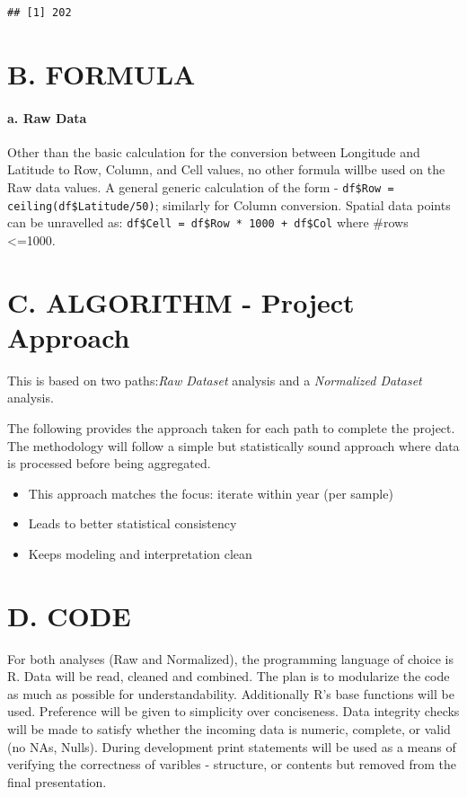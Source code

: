\documentclass[
]{article}
\begin{document}
\begin{verbatim}
## [1] 202
\end{verbatim}

\section{B. FORMULA}\label{b.-formula}

\paragraph{a. Raw Data}\label{a.-raw-data}

Other than the basic calculation for the conversion between Longitude
and Latitude to Row, Column, and Cell values, no other formula willbe
used on the Raw data values. A general generic calculation of the form -
\texttt{df\$Row = ceiling(df\$Latitude/50)}; similarly for Column
conversion. Spatial data points can be unravelled as:
\texttt{df\$Cell = df\$Row * 1000 + df\$Col} where \#rows
\textless=1000.

\section{C. ALGORITHM - Project
Approach}\label{c.-algorithm---project-approach}

This is based on two paths:\emph{Raw Dataset} analysis and a
\emph{Normalized Dataset} analysis.

The following provides the approach taken for each path to complete the
project. The methodology will follow a simple but statistically sound
approach where data is processed before being aggregated.

\begin{itemize}
\item
  This approach matches the focus: iterate within year (per sample)
\item
  Leads to better statistical consistency
\item
  Keeps modeling and interpretation clean
\end{itemize}

\section{D. CODE}\label{d.-code}

For both analyses (Raw and Normalized), the programming language of
choice is R. Data will be read, cleaned and combined. The plan is to
modularize the code as much as possible for understandability.
Additionally R's base functions will be used. Preference will be given
to simplicity over conciseness. Data integrity checks will be made to
satisfy whether the incoming data is numeric, complete, or valid (no
NAs, Nulls). During development print statements will be used as a means
of verifying the correctness of varibles - structure, or contents but
removed from the final presentation.
\end{document}
